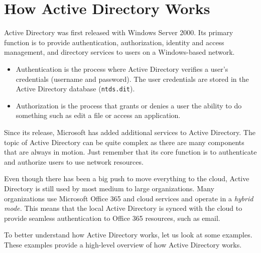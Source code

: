 \chapter{How Active Directory Works}
Active Directory was first released with Windows Server 2000. Its primary function is to provide authentication, authorization, identity and access management, and directory services to users on a Windows-based network.
\begin{itemize}
    \item Authentication is the process where Active Directory verifies a user's credentials (username and password). The user credentials are stored in the Active Directory database (\texttt{ntds.dit}).
    \item Authorization is the process that grants or denies a user the ability to do something such as edit a file or access an application.
\end{itemize}

Since its release, Microsoft has added additional services to Active Directory. The topic of Active Directory can be quite complex as there are many components that are always in motion. Just remember that its core function is to authenticate and authorize users to use network resources.

Even though there has been a big push to move everything to the cloud, Active Directory is still used by most medium to large organizations. Many organizations use Microsoft Office 365 and cloud services and operate in a \textit{hybrid mode.} This means that the local Active Directory is synced with the cloud to provide seamless authentication to Office 365 resources, such as email.

To better understand how Active Directory works, let us look at some examples. These examples provide a high-level overview of how Active Directory works.

